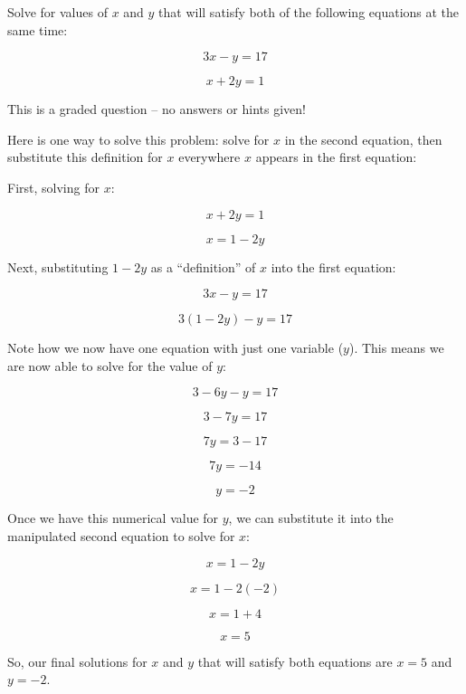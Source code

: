 

Solve for values of $x$ and $y$ that will satisfy both of the following equations at the same time:

$$3x - y = 17$$

$$x + 2y = 1$$

\vfil 

\eject






This is a graded question -- no answers or hints given!







Here is one way to solve this problem: solve for $x$ in the second equation, then substitute this definition for $x$ everywhere $x$ appears in the first equation:

\vskip 10pt

First, solving for $x$:

$$x + 2y = 1$$

$$x = 1 - 2y$$

Next, substituting $1 - 2y$ as a ``definition'' of $x$ into the first equation: 

$$3x - y = 17$$

$$3(1 - 2y) - y = 17$$

Note how we now have one equation with just one variable ($y$).  This means we are now able to solve for the value of $y$:

$$3 - 6y - y = 17$$

$$3 - 7y = 17$$

$$7y = 3 - 17$$

$$7y = -14$$

$$y = -2$$

\vskip 10pt

Once we have this numerical value for $y$, we can substitute it into the manipulated second equation to solve for $x$:

$$x = 1 - 2y$$

$$x = 1 - 2(-2)$$

$$x = 1 + 4$$

$$x = 5$$

So, our final solutions for $x$ and $y$ that will satisfy both equations are $x = 5$ and $y = -2$.




